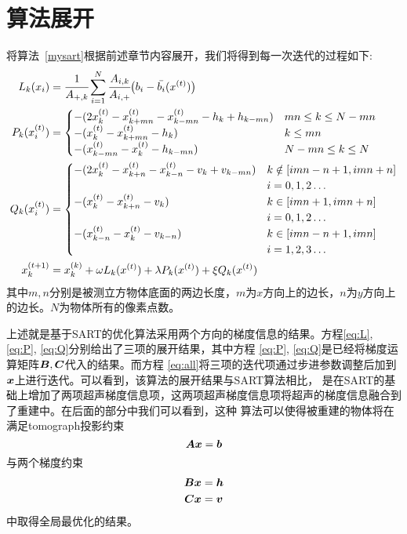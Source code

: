 \section{算法展开}\label{sec:algodetail}
将算法~\ref{mysart}根据前述章节内容展开，我们将得到每一次迭代的过程如下:
\begin{align}
 L_k(x_i) &= \cfrac{1}{A_{+,k}}\sum^N_{i=1}\cfrac{A_{i,k}}{A_{i,+}}\bigl(b_i-\bar{b_i}(x^{(t)})\bigr) \label{eq:L} \\
P_k(x_i^{(t)}) &= \begin{cases}
                            -(2x_k^{(t)} - x_{k+mn}^{(t)} - x_{k-mn}^{(t)} - h_k + h_{k-mn}) & mn \le k \le N-mn \\
                            -(x_k^{(t)} - x_{k+mn}^{(t)} - h_k) &  k\le mn \\
                            -(x_{k-mn}^{(t)} - x_{k}^{(t)} - h_{k-mn}) &  N-mn \le k \le N
                        \end{cases}  \label{eq:P} \\
Q_k(x_i^{(t)}) &= \begin{cases}
                            -(2x_k^{(t)} - x_{k+n}^{(t)} - x_{k-n}^{(t)} - v_k + v_{k-mn}) & k \notin [ imn-n+1, imn+n]
                            \\ &i = 0,1,2\hdots\\
                            -(x_k^{(t)} - x_{k+n}^{(t)} - v_k) & k \in \left[imn+1,imn+n\right] \\ &i = 0,1,2\hdots\\
                            -(x_{k-n}^{(t)} - x_{k}^{(t)} - v_{k-n}) &  k \in [imn-n+1,imn] \\ &i= 1,2,3 \hdots
                        \end{cases} \label{eq:Q} \\
x_k^{(t+1)}&= x_k^{(k)} + \omega L_k(x^{(t)}) + \lambda P_k(x^{(t)}) + \xi Q_k(x^{(t)}) \label{eq:all}
\end{align}
其中$m,n$分别是被测立方物体底面的两边长度，$m$为$x$方向上的边长，$n$为$y$方向上的边长。$N$为物体所有的像素点数。

上述就是基于SART的优化算法采用两个方向的梯度信息的结果。方程\eqref{eq:L}, \eqref{eq:P}, \eqref{eq:Q}分别给出了三项的展开结果，其中方程
\eqref{eq:P}, \eqref{eq:Q}是已经将梯度运算矩阵$\bm{ B},\bm{C}$代入的结果。而方程
\eqref{eq:all}将三项的迭代项通过步进参数调整后加到$\bm{ x}$上进行迭代。可以看到，该算法的展开结果与SART算法相比，
是在SART的基础上增加了两项超声梯度信息项，这两项超声梯度信息项将超声的梯度信息融合到了重建中。在后面的部分中我们可以看到，这种
算法可以使得被重建的物体将在满足tomograph投影约束
\begin{equation*}
\bm{ A}\bm{ x} = \bm{b}
\end{equation*}
与两个梯度约束
\begin{align*}
\bm{ B}\bm{ x} &= \bm{ h} \\
\bm{C}\bm{ x} &= \bm{ v} 
\end{align*}
中取得全局最优化的结果。

